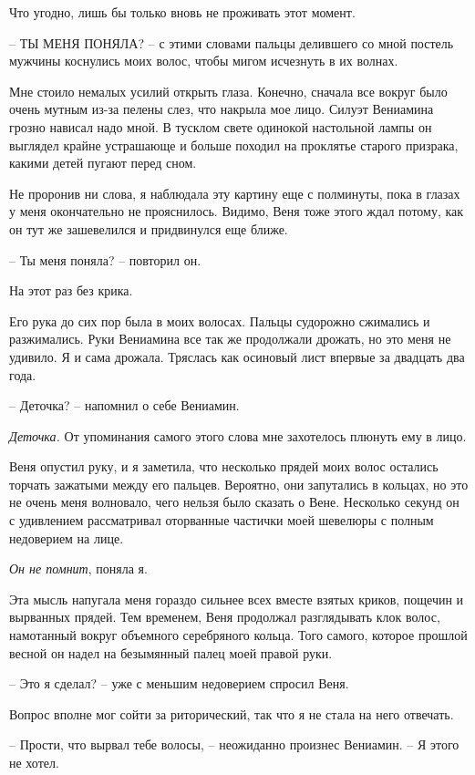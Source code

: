 \documentclass[
]{book}
\begin{document}
Что угодно, лишь бы только вновь не проживать этот момент.

-- ТЫ МЕНЯ ПОНЯЛА? -- с этими словами пальцы делившего со мной постель мужчины коснулись моих волос, чтобы мигом исчезнуть в их волнах.

Мне стоило немалых усилий открыть глаза. Конечно, сначала все вокруг было очень мутным из-за пелены слез, что накрыла мое лицо. Силуэт Вениамина грозно нависал надо мной. В тусклом свете одинокой настольной лампы он выглядел крайне устрашающе и больше походил на проклятье старого призрака, какими детей пугают перед сном.

Не проронив ни слова, я наблюдала эту картину еще с полминуты, пока в глазах у меня окончательно не прояснилось. Видимо, Веня тоже этого ждал потому, как он тут же зашевелился и придвинулся еще ближе.

-- Ты меня поняла? -- повторил он.

На этот раз без крика.

Его рука до сих пор была в моих волосах. Пальцы судорожно сжимались и разжимались. Руки Вениамина все так же продолжали дрожать, но это меня не удивило. Я и сама дрожала. Тряслась как осиновый лист впервые за двадцать два года.

-- Деточка? -- напомнил о себе Вениамин.

\emph{Деточка.} От упоминания самого этого слова мне захотелось плюнуть ему в лицо.

Веня опустил руку, и я заметила, что несколько прядей моих волос остались торчать зажатыми между его пальцев. Вероятно, они запутались в кольцах, но это не очень меня волновало, чего нельзя было сказать о Вене. Несколько секунд он с удивлением рассматривал оторванные частички моей шевелюры с полным недоверием на лице.

\emph{Он не помнит}, поняла я.

Эта мысль напугала меня гораздо сильнее всех вместе взятых криков, пощечин и вырванных прядей. Тем временем, Веня продолжал разглядывать клок волос, намотанный вокруг объемного серебряного кольца. Того самого, которое прошлой весной он надел на безымянный палец моей правой руки.

-- Это я сделал? -- уже с меньшим недоверием спросил Веня.

Вопрос вполне мог сойти за риторический, так что я не стала на него отвечать.

-- Прости, что вырвал тебе волосы, -- неожиданно произнес Вениамин. -- Я этого не хотел.
\end{document}
